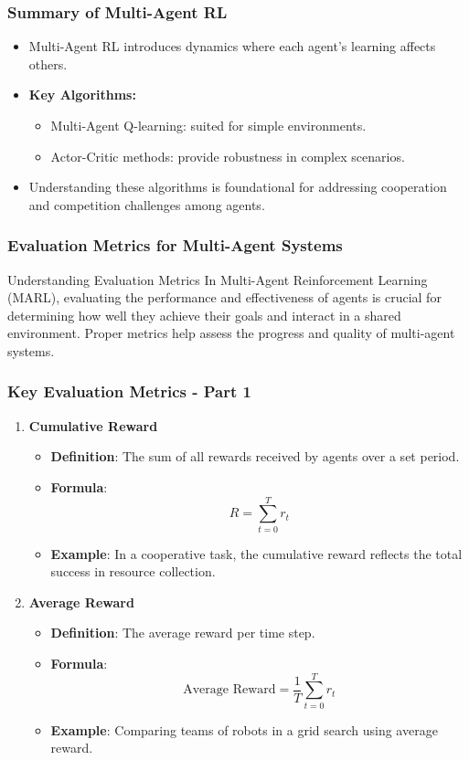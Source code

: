 \documentclass[aspectratio=169]{beamer}
\begin{document}
\begin{frame}[fragile]
    \frametitle{Summary of Multi-Agent RL}
    \begin{itemize}
        \item Multi-Agent RL introduces dynamics where each agent's learning affects others.
        \item \textbf{Key Algorithms:} 
        \begin{itemize}
            \item Multi-Agent Q-learning: suited for simple environments.
            \item Actor-Critic methods: provide robustness in complex scenarios.
        \end{itemize}
        \item Understanding these algorithms is foundational for addressing cooperation and competition challenges among agents.
    \end{itemize}
\end{frame}

\begin{frame}[fragile]
    \frametitle{Evaluation Metrics for Multi-Agent Systems}
    \begin{block}{Understanding Evaluation Metrics}
        In Multi-Agent Reinforcement Learning (MARL), evaluating the performance and effectiveness of agents is crucial for determining how well they achieve their goals and interact in a shared environment. Proper metrics help assess the progress and quality of multi-agent systems.
    \end{block}
\end{frame}

\begin{frame}[fragile]
    \frametitle{Key Evaluation Metrics - Part 1}
    \begin{enumerate}
        \item \textbf{Cumulative Reward}
        \begin{itemize}
            \item \textbf{Definition}: The sum of all rewards received by agents over a set period.
            \item \textbf{Formula}: 
            \[
            R = \sum_{t=0}^{T} r_t
            \]
            \item \textbf{Example}: In a cooperative task, the cumulative reward reflects the total success in resource collection.
        \end{itemize}
        
        \item \textbf{Average Reward}
        \begin{itemize}
            \item \textbf{Definition}: The average reward per time step.
            \item \textbf{Formula}: 
            \[
            \text{Average Reward} = \frac{1}{T} \sum_{t=0}^{T} r_t
            \]
            \item \textbf{Example}: Comparing teams of robots in a grid search using average reward.
        \end{itemize}
    \end{enumerate}
\end{frame}
\end{document}
